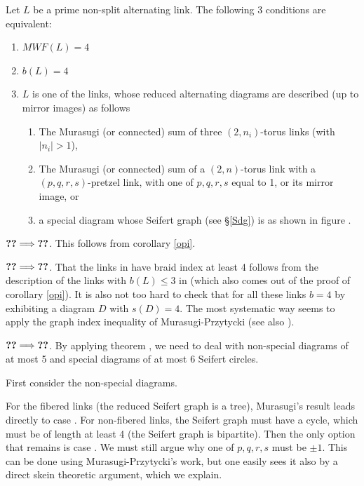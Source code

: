 \begin{theorem}\label{tty}
Let $L$ be a prime non-split alternating link. The following 3
conditions are equivalent:
\begin{enumerate}
\item\label{Xa} $MWF(L)=4$
\item\label{Xb} $b(L)=4$
\item\label{Xc} $L$ is one of the links, whose reduced 
alternating diagrams are described (up to mirror images) as follows
\begin{enumerate}
\item\label{Ya} The Murasugi (or connected) sum of three
  $(2,n_i)$-torus links (with $|n_i|>1$),
\item\label{Yb} The Murasugi (or connected) sum of a $(2,n)$-torus
  link with a $(p,q,r,s)$-pretzel link, with one of $p,q,r,s$ equal
  to 1, or its mirror image, or
\item\label{Yc} a special diagram whose Seifert graph
(see \S\ref{Sdg}) is as shown in figure .
\end{enumerate}
\end{enumerate}
\end{theorem}

\proof $\reference{Xb}\So \reference{Xa}$. This follows from
corollary \ref{opi}.

$\reference{Xc}\So \reference{Xb}$. That the links in
 have braid index at least 4 follows from the
description of the links with $b(L)\le 3$ in \cite{3br}
(which also comes out of the proof of corollary \eqref{opi}).
It is also not too hard to check that for all these links
$b=4$ by exhibiting a diagram $D$ with $s(D)=4$. The most
systematic way seems to apply the graph index inequality of
Murasugi-Przytycki \cite{MurPrz2} (see also \cite{Ohyama}).

$\reference{Xa}\So \reference{Xc}$. By applying theorem
, we need to deal with non-special
diagrams of at most 5 and special diagrams of at most 6
Seifert circles.

First consider the non-special diagrams.

For the fibered links (the reduced Seifert graph is a tree),
Murasugi's result \cite{Murasugi} leads directly to case
. For non-fibered links, the Seifert graph
must have a cycle, which must be of length at least 4 (the
Seifert graph is bipartite). Then the only option
that remains is case . We must still
argue why one of $p,q,r,s$ must be $\pm 1$. This can
be done using Murasugi-Przytycki's work, but one easily
sees it also by a direct skein theoretic argument, which
we explain.

